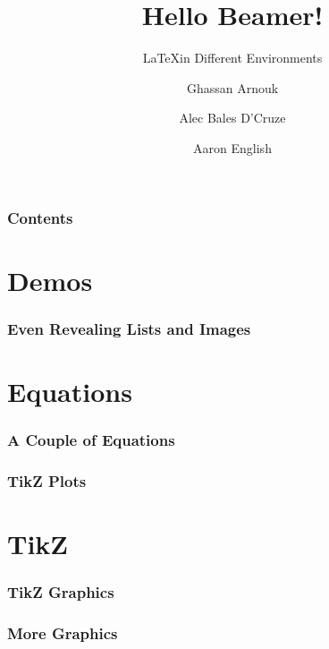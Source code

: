 \documentclass{beamer}
\title{Hello Beamer!}
\subtitle{\LaTeX in Different Environments}
\author{Ghassan Arnouk \and
            Alec Bales D'Cruze \and
            Aaron English}
\date{\DTMusedate{presentation}}
\begin{document}
    \begin{frame}
        \titlepage
    \end{frame}
    \begin{frame}
        \frametitle{Contents}
        \tableofcontents
    \end{frame}
    \section{Demos}
        \begin{frame}
            \frametitle{Even Revealing Lists and Images}
            \begin{overlayarea}{\textwidth}{\textheight}
            \end{overlayarea}
        \end{frame}
    \section{Equations}
        \begin{frame}
            \frametitle{A Couple of Equations}
        \end{frame}
        \begin{frame}
            \frametitle{TikZ Plots}
        \end{frame}
    \section{TikZ}
        \begin{frame}
            \frametitle{TikZ Graphics}
        \end{frame}
        \begin{frame}
            \frametitle{More Graphics}
          \end{frame}
\end{document}

